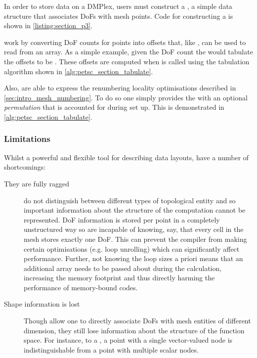 \documentclass[thesis]{subfiles}
\begin{document}
In order to store data on a DMPlex, users must construct a , a simple data structure that associates DoFs with mesh points.
Code for constructing a  is shown in \cref{listing:section_p3}.

 work by converting DoF counts for points into offsets that, like \numpy{}, can be used to read from an array.
As a simple example, given the DoF count \ccode{[1, 0, 3, 2, 0, 1]} the  would tabulate the offsets to be \ccode{[0, 1, 1, 4, 6, 6]}.
These offsets are computed when  is called using the tabulation algorithm shown in \cref{alg:petsc_section_tabulate}.

Also,  are able to express the renumbering locality optimisations described in \cref{sec:intro_mesh_numbering}.
To do so one simply provides the  with an optional \emph{permutation} that is accounted for during set up.
This is demonstrated in \cref{alg:petsc_section_tabulate}.

\subsubsection{Limitations}

Whilst a powerful and flexible tool for describing data layouts,  have a number of shortcomings:

\begin{description}
  \item[They are fully ragged]
     do not distinguish between different types of topological entity and so important information about the structure of the computation cannot be represented.
    DoF information is stored per point in a completely unstructured way so  are incapable of knowing, say, that every cell in the mesh stores exactly one DoF.
    This can prevent the compiler from making certain optimisations (e.g. loop unrolling) which can significantly affect performance.
    Further, not knowing the loop sizes a priori means that an additional array needs to be passed about during the calculation, increasing the memory footprint and thus directly harming the performance of memory-bound codes.

  \item[Shape information is lost]
    Though  allow one to directly associate DoFs with mesh entities of different dimension, they still lose information about the structure of the function space.
    For instance, to a , a point with a single vector-valued node is indistinguishable from a point with multiple scalar nodes.
\end{description}
\end{document}
